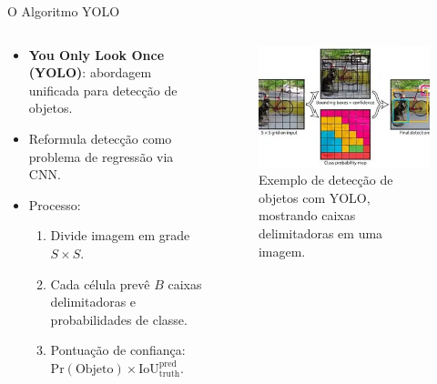 \documentclass{if-beamer}
\begin{document}
\begin{frame}{O Algoritmo YOLO}
	\begin{columns}[T]
		\begin{column}{0.5\textwidth}
			\begin{itemize}
				\item \textbf{You Only Look Once (YOLO)}: abordagem unificada para detecção de objetos.
				\item Reformula detecção como problema de regressão via CNN.
				\item Processo:
				\begin{enumerate}
					\item Divide imagem em grade $S \times S$.
					\item Cada célula prevê $B$ caixas delimitadoras e probabilidades de classe.
					\item Pontuação de confiança: $\mathrm{Pr}(\text{Objeto}) \times \text{IoU}_{\text{truth}}^{\text{pred}}$.
				\end{enumerate}
			\end{itemize}
		\end{column}
		\begin{column}{0.5\textwidth}
			\begin{figure}
				\centering
				\includegraphics[width=\textwidth]{figuras/yolo.png}
				\caption{Exemplo de detecção de objetos com YOLO, mostrando caixas delimitadoras em uma imagem.}
				\label{fig:yolo_example}
			\end{figure}
		\end{column}
	\end{columns}
\end{frame}
	
\end{document}
